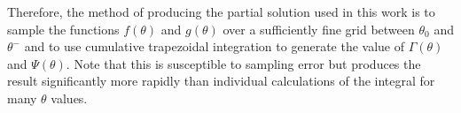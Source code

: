 Therefore, the method of producing the partial solution used in this work is to sample the functions $f(\theta)$ and $g(\theta)$ over a sufficiently fine grid between $\theta_0$ and $\theta^-$ and to use cumulative trapezoidal integration to generate the value of $\Gamma(\theta)$ and $\Psi(\theta)$. Note that this is susceptible to sampling error but produces the result significantly more rapidly than individual calculations of the integral for many $\theta$ values.